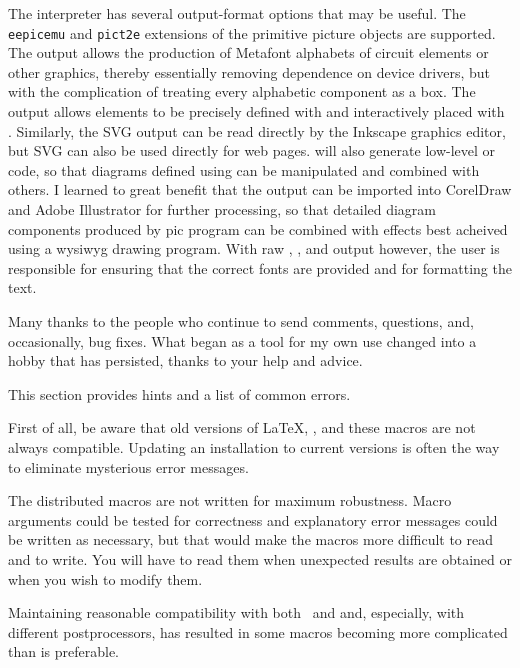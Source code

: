 The \dpic interpreter has several output-format options that may be
useful.  The {\tt eepicemu} and {\tt pict2e} extensions of the
primitive \latex picture objects are supported.  The \mfpic output
allows the production of Metafont alphabets of circuit elements or
other graphics, thereby essentially removing dependence on device
drivers, but with the complication of treating every alphabetic
component as a \tex box.  The \xfig output allows elements to be
precisely defined with \dpic  and interactively placed with \xfig.
Similarly, the SVG output can be read directly by the Inkscape graphics
editor, but SVG can also be used directly for web pages.
\Dpic will also generate low-level \MetaPost or \Postscript code, so
that diagrams defined using \pic can be manipulated and combined with
others.
I learned to great benefit that the \Postscript output can be imported
into CorelDraw and Adobe Illustrator for further processing, so that
detailed diagram components produced by pic program can be combined
with effects best acheived using a wysiwyg drawing program.  With raw
\Postscript, \PDF, and \SVG output however, the user is responsible for
ensuring that the correct fonts are provided and for formatting the text.

Many thanks to the people who continue to send comments, questions,
and, occasionally, bug fixes. What began as a tool for my own use changed
into a hobby that has persisted, thanks to your help and advice.

This section provides hints and a list of common errors.

First of all, be aware that old versions of \LaTeX, \dpic, and these
macros are not always compatible.  Updating an installation to current
versions is often the way to eliminate mysterious error messages.

The distributed macros are not written for maximum robustness.
Macro arguments could be tested for correctness and
explanatory error messages could be written as necessary, but that
would make the macros more difficult to read and to write.  You will
have to read them when unexpected results are obtained or when you wish
to modify them.

Maintaining reasonable compatibility with both \gpic\ and \dpic
and, especially, with different postprocessors, has
resulted in some macros becoming more complicated than is preferable.

